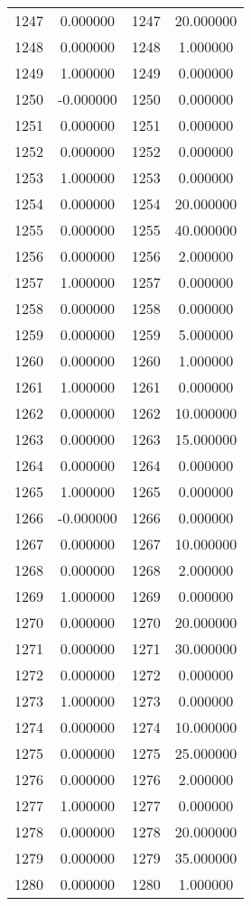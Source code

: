 \documentclass[12pt]{article}
\begin{document}
\begin{longtable}{@{}cccc@{}}
1247 & 0.000000 & 1247 & 20.000000 \\
1248 & 0.000000 & 1248 & 1.000000 \\
1249 & 1.000000 & 1249 & 0.000000 \\
1250 & -0.000000 & 1250 & 0.000000 \\
1251 & 0.000000 & 1251 & 0.000000 \\
1252 & 0.000000 & 1252 & 0.000000 \\
1253 & 1.000000 & 1253 & 0.000000 \\
1254 & 0.000000 & 1254 & 20.000000 \\
1255 & 0.000000 & 1255 & 40.000000 \\
1256 & 0.000000 & 1256 & 2.000000 \\
1257 & 1.000000 & 1257 & 0.000000 \\
1258 & 0.000000 & 1258 & 0.000000 \\
1259 & 0.000000 & 1259 & 5.000000 \\
1260 & 0.000000 & 1260 & 1.000000 \\
1261 & 1.000000 & 1261 & 0.000000 \\
1262 & 0.000000 & 1262 & 10.000000 \\
1263 & 0.000000 & 1263 & 15.000000 \\
1264 & 0.000000 & 1264 & 0.000000 \\
1265 & 1.000000 & 1265 & 0.000000 \\
1266 & -0.000000 & 1266 & 0.000000 \\
1267 & 0.000000 & 1267 & 10.000000 \\
1268 & 0.000000 & 1268 & 2.000000 \\
1269 & 1.000000 & 1269 & 0.000000 \\
1270 & 0.000000 & 1270 & 20.000000 \\
1271 & 0.000000 & 1271 & 30.000000 \\
1272 & 0.000000 & 1272 & 0.000000 \\
1273 & 1.000000 & 1273 & 0.000000 \\
1274 & 0.000000 & 1274 & 10.000000 \\
1275 & 0.000000 & 1275 & 25.000000 \\
1276 & 0.000000 & 1276 & 2.000000 \\
1277 & 1.000000 & 1277 & 0.000000 \\
1278 & 0.000000 & 1278 & 20.000000 \\
1279 & 0.000000 & 1279 & 35.000000 \\
1280 & 0.000000 & 1280 & 1.000000 \\

\end{longtable}
\end{document}
